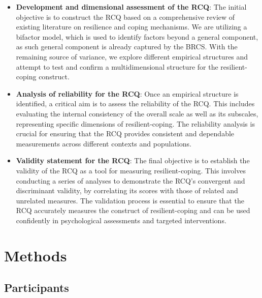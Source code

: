 \documentclass[
  man,floatsintext]{apa7}
\begin{document}
\begin{itemize}
\item
  \textbf{Development and dimensional assessment of the RCQ}: The initial objective is to construct the RCQ based on a comprehensive review of existing literature on resilience and coping mechanisms. We are utilizing a bifactor model, which is used to identify factors beyond a general component, as such general component is already captured by the BRCS. With the remaining source of variance, we explore different empirical structures and attempt to test and confirm a multidimensional structure for the resilient-coping construct.
\item
  \textbf{Analysis of reliability for the RCQ}: Once an empirical structure is identified, a critical aim is to assess the reliability of the RCQ. This includes evaluating the internal consistency of the overall scale as well as its subscales, representing specific dimensions of resilient-coping. The reliability analysis is crucial for ensuring that the RCQ provides consistent and dependable measurements across different contexts and populations.
\item
  \textbf{Validity statement for the RCQ}: The final objective is to establish the validity of the RCQ as a tool for measuring resilient-coping. This involves conducting a series of analyses to demonstrate the RCQ's convergent and discriminant validity, by correlating its scores with those of related and unrelated measures. The validation process is essential to ensure that the RCQ accurately measures the construct of resilient-coping and can be used confidently in psychological assessments and targeted interventions.
\end{itemize}

\section{Methods}\label{methods}

\subsection{Participants}\label{participants}
\end{document}
